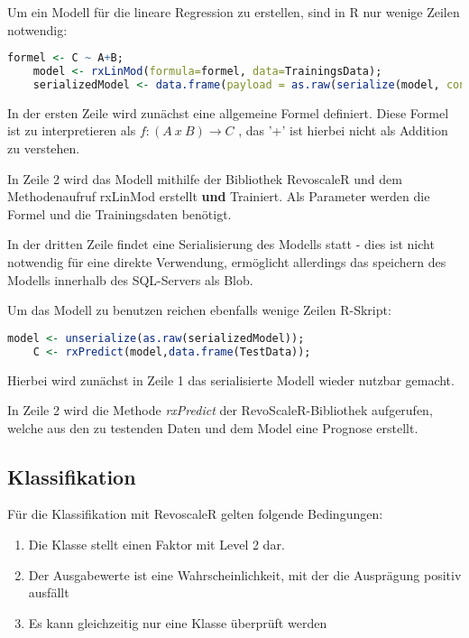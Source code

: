 Um ein Modell für die lineare Regression zu erstellen, sind in R nur wenige Zeilen notwendig: ~\newline
\begin{lstlisting}[language=R]
	formel <- C ~ A+B;
	model <- rxLinMod(formula=formel, data=TrainingsData);
	serializedModel <- data.frame(payload = as.raw(serialize(model, connection=null)));
\end{lstlisting}

In der ersten Zeile wird zunächst eine allgemeine Formel definiert. Diese Formel ist zu interpretieren als $f: (A~x~B)\rightarrow C $ , das '+' ist hierbei nicht als Addition zu verstehen.

In Zeile 2 wird das Modell mithilfe der Bibliothek RevoscaleR und dem Methodenaufruf rxLinMod erstellt \textbf{und} Trainiert. Als Parameter werden die Formel und die Trainingsdaten benötigt. 

In der dritten Zeile findet eine Serialisierung des Modells statt - dies ist nicht notwendig für eine direkte Verwendung, ermöglicht allerdings das speichern des Modells innerhalb des SQL-Servers als Blob.  

Um das Modell zu benutzen reichen ebenfalls wenige Zeilen R-Skript: \newline

\begin{lstlisting}[language=R]
	model <- unserialize(as.raw(serializedModel)); 
	C <- rxPredict(model,data.frame(TestData));
\end{lstlisting}

Hierbei wird zunächst in Zeile 1 das serialisierte Modell wieder nutzbar gemacht. 

In Zeile 2 wird die Methode \textit{rxPredict} der RevoScaleR-Bibliothek aufgerufen, welche aus den zu testenden Daten und dem Model eine Prognose erstellt. 
\subsection{Klassifikation}
Für die Klassifikation mit RevoscaleR gelten folgende Bedingungen: ~\newline

\begin{enumerate}
	\item Die Klasse stellt einen Faktor mit Level 2 dar.
	\item Der Ausgabewerte ist eine Wahrscheinlichkeit, mit der die Ausprägung positiv ausfällt
	\item Es kann gleichzeitig nur eine Klasse überprüft werden
\end{enumerate}

